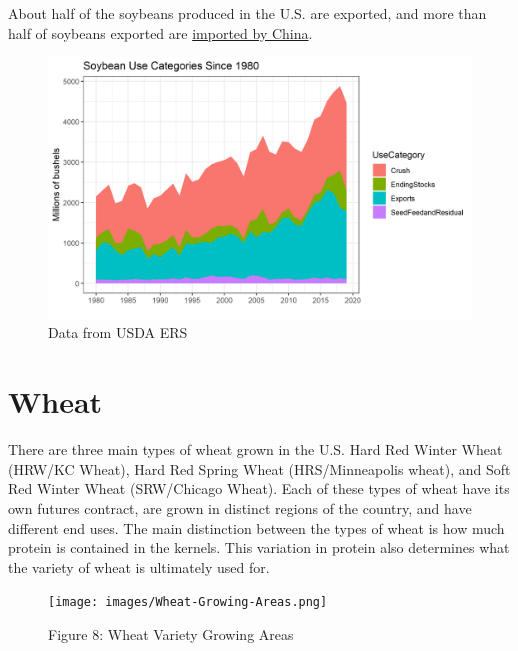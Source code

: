 \documentclass[
  letterpaper,
  DIV=11,
  numbers=noendperiod]{scrreprt}
\begin{document}
About half of the soybeans produced in the U.S. are exported, and more
than half of soybeans exported are
\href{http://farmdocdaily.illinois.edu/2015/03/footprint-of-chinese-demand-for-us-soybeans.html}{imported
by China}.

\begin{figure}

{\centering \includegraphics{assets/PrimerforGrain_SoyUse.png}

}

\caption{Data from USDA ERS}

\end{figure}

\hypertarget{wheat}{%
\section{Wheat}\label{wheat}}

There are three main types of wheat grown in the U.S. Hard Red Winter
Wheat (HRW/KC Wheat), Hard Red Spring Wheat (HRS/Minneapolis wheat), and
Soft Red Winter Wheat (SRW/Chicago Wheat). Each of these types of wheat
have its own futures contract, are grown in distinct regions of the
country, and have different end uses. The main distinction between the
types of wheat is how much protein is contained in the kernels. This
variation in protein also determines what the variety of wheat is
ultimately used for.

\begin{figure}

{\centering \texttt{[image: images/Wheat-Growing-Areas.png]}

}

\caption{Figure 8: Wheat Variety Growing Areas}

\end{figure}
\end{document}
